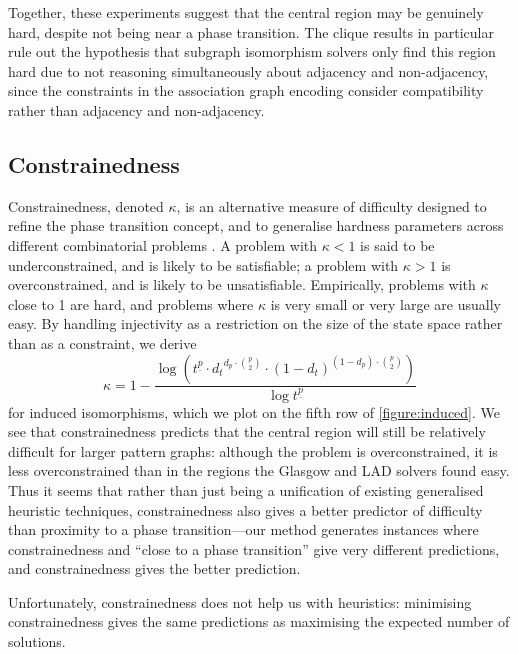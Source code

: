 \documentclass[twoside,11pt]{article}
\newcommand{\citep}[1]{\cite{#1}}
\begin{document}
Together, these experiments suggest that the central region may be genuinely hard, despite not being
near a phase transition. The clique results in particular rule out the hypothesis that subgraph
isomorphism solvers only find this region hard due to not reasoning simultaneously about adjacency
and non-adjacency, since the constraints in the association graph encoding consider compatibility
rather than adjacency and non-adjacency.

\subsection{Constrainedness}

Constrainedness, denoted $\kappa$, is an alternative measure of difficulty designed to refine the
phase transition concept, and to generalise hardness parameters across different combinatorial
problems \citep{DBLP:conf/aaai/GentMPW96}. A problem with $\kappa < 1$ is said to be underconstrained, and is
likely to be satisfiable; a problem with $\kappa > 1$ is overconstrained, and is likely to be
unsatisfiable. Empirically, problems with $\kappa$ close to 1 are hard, and problems where $\kappa$
is very small or very large are usually easy. By handling injectivity as a restriction on the size
of the state space rather than as a constraint, we derive
\begin{equation}\label{equation:constrainedness}\kappa = 1 - \frac{\log \left(
t^{\underline{p}} \cdot {d_t}^{d_p \cdot \binom{p}{2}} \cdot {(1 - d_{t})}^{(1 - d_{p}) \cdot
\binom{p}{2}} \right)}{\log t^{\underline{p}}} \end{equation} for induced isomorphisms, which we plot on the
fifth row of \cref{figure:induced}. We see that constrainedness predicts that the central region
will still be relatively difficult for larger pattern graphs: although the problem is
overconstrained, it is less overconstrained than in the regions the Glasgow and LAD solvers found
easy.  Thus it seems that rather than just being a unification of existing generalised heuristic
techniques, constrainedness also gives a better predictor of difficulty than proximity to a phase
transition---our method generates instances where constrainedness and ``close to a phase
transition'' give very different predictions, and constrainedness gives the better prediction.

Unfortunately, constrainedness does not help us with heuristics: minimising constrainedness gives
the same predictions as maximising the expected number of solutions.
\end{document}
